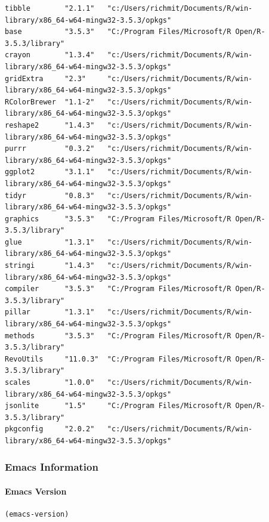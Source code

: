 \documentclass[11pt]{article}
\begin{document}
\begin{verbatim}
tibble        "2.1.1"   "c:/Users/richmit/Documents/R/win-library/x86_64-w64-mingw32-3.5.3/opkgs"
base          "3.5.3"   "C:/Program Files/Microsoft/R Open/R-3.5.3/library"                      
crayon        "1.3.4"   "c:/Users/richmit/Documents/R/win-library/x86_64-w64-mingw32-3.5.3/opkgs"
gridExtra     "2.3"     "c:/Users/richmit/Documents/R/win-library/x86_64-w64-mingw32-3.5.3/opkgs"
RColorBrewer  "1.1-2"   "c:/Users/richmit/Documents/R/win-library/x86_64-w64-mingw32-3.5.3/opkgs"
reshape2      "1.4.3"   "c:/Users/richmit/Documents/R/win-library/x86_64-w64-mingw32-3.5.3/opkgs"
purrr         "0.3.2"   "c:/Users/richmit/Documents/R/win-library/x86_64-w64-mingw32-3.5.3/opkgs"
ggplot2       "3.1.1"   "c:/Users/richmit/Documents/R/win-library/x86_64-w64-mingw32-3.5.3/opkgs"
tidyr         "0.8.3"   "c:/Users/richmit/Documents/R/win-library/x86_64-w64-mingw32-3.5.3/opkgs"
graphics      "3.5.3"   "C:/Program Files/Microsoft/R Open/R-3.5.3/library"                      
glue          "1.3.1"   "c:/Users/richmit/Documents/R/win-library/x86_64-w64-mingw32-3.5.3/opkgs"
stringi       "1.4.3"   "c:/Users/richmit/Documents/R/win-library/x86_64-w64-mingw32-3.5.3/opkgs"
compiler      "3.5.3"   "C:/Program Files/Microsoft/R Open/R-3.5.3/library"                      
pillar        "1.3.1"   "c:/Users/richmit/Documents/R/win-library/x86_64-w64-mingw32-3.5.3/opkgs"
methods       "3.5.3"   "C:/Program Files/Microsoft/R Open/R-3.5.3/library"                      
RevoUtils     "11.0.3"  "C:/Program Files/Microsoft/R Open/R-3.5.3/library"                      
scales        "1.0.0"   "c:/Users/richmit/Documents/R/win-library/x86_64-w64-mingw32-3.5.3/opkgs"
jsonlite      "1.5"     "C:/Program Files/Microsoft/R Open/R-3.5.3/library"                      
pkgconfig     "2.0.2"   "c:/Users/richmit/Documents/R/win-library/x86_64-w64-mingw32-3.5.3/opkgs"
\end{verbatim}

\subsubsection{Emacs Information}
\label{sec:orgc1c70a0}

\paragraph{Emacs Version}
\label{sec:org4ffb94c}

\begin{verbatim}
(emacs-version)
\end{verbatim}
\end{document}
